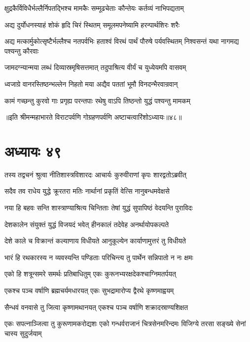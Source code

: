 \twolineshloka
{क्षुद्रकैर्विविधैर्भल्लैर्निपतद्भिश्च मामकैः}
{सम्मूढचेताः कौन्तेयः कर्तव्यं नाभिपद्यताम्}


\twolineshloka
{अद्य दुर्योधनस्याहं शोकं हृदि चिरं स्थितम्}
{समूलमपनेष्यामि हरन्पार्थशिरः शरैः}


\threelineshloka
{अद्य मत्कार्मुकोत्सृष्टैर्भल्लैश्च नतपर्वभिः}
{हताश्वं विरथं पार्थं पौरुषे पर्यवस्थितम्}
{निश्वसन्तं यथा नागमद्य पश्यन्तु कौरवाः}


\twolineshloka
{जामदग्न्यान्मया लब्धं दिव्यास्रमृषिसत्तमात्}
{तदुपाश्रित्य वीर्यं च युध्येयमपि वासवम्}


\twolineshloka
{ध्वजाग्रे वानरस्तिष्ठन्भल्लेन निहतो मया}
{अद्यैव पततां भूमौ विनदन्भैरवान्रवान्}


\twolineshloka
{कामं गच्छन्तु कुरवो गाः प्रगृह्य परन्तपाः}
{रथेषु वाऽपि तिष्ठन्तो युद्धं पश्यन्तु मामकम्}

॥इति श्रीमन्महाभारते विराटपर्वणि गोग्रहणपर्वणि अष्टाचत्वारिंशोऽध्यायः॥४८॥

\chapter{अध्यायः ४९}

\twolineshloka
{तस्य तद्वचनं श्रुत्वा नीतिशास्त्रविशारदः}
{आचार्यः कुरुवीराणां कृपः शारद्वतोऽब्रवीत्}


\twolineshloka
{सदैव तव राधेय युद्धे क्रूरतरा मतिः}
{नार्थानां प्रकृतिं वेत्सि नानुबन्धमवेक्षसे}


\twolineshloka
{नया हि बहवः सन्ति शास्त्राण्याश्रित्य चिन्तिताः}
{तेषां युद्धं सुपापिष्ठं वेदयन्ति पुराविदः}


\twolineshloka
{देशकालेन संयुक्तं युद्धं विजयदं भवेत्}
{हीनकालं तदेवेह अनर्थायोपकल्पते}


\twolineshloka
{देशे काले च विक्रान्तं कल्याणाय विधीयते}
{आनुकूल्येन कार्याणामुत्तरं तु विधीयते}


\twolineshloka
{भारं हि रथकारस्य न व्यवस्यन्ति पण्डिताः}
{परिचिन्त्य तु पार्थेन सन्निपातो न नः क्षमः}


\twolineshloka
{एको हि शत्रून्समरे समर्थः प्रतिबाधितुम्}
{एकः कुरूनभ्यरक्षदेकश्चाग्निमतर्पयत्}


\twolineshloka
{एकश्च पञ्च वर्षाणि ब्रह्मचर्यमधारयत्}
{एकः सुभद्रामारोप्य द्वैरथे कृष्णमाह्वयम्}


\twolineshloka
{सैन्धवं वनवासे तु जित्वा कृष्णामथानयत्}
{एकश्च पञ्च वर्षाणि शक्रादस्राण्यशिक्षत}


\threelineshloka
{एकः सपत्नाञ्जित्वा तु कुरूणामकरोद्यशः}
{एको गन्धर्वराजानं चित्रसेनमरिन्दमः}
{विजिग्ये तरसा सङ्ख्ये सेनां चास्य सुदुर्जयाम्}


